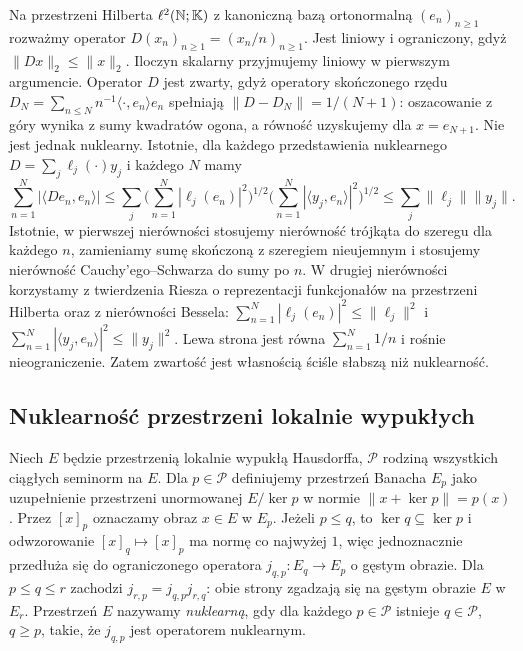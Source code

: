 \begin{przyklad}
\label{ex:compact-nonnuclear23}
Na przestrzeni Hilberta $\ell^2(\mathbb N;\mathbb K)$ z kanoniczną
bazą ortonormalną $(e_n)_{n\ge1}$ rozważmy operator
$D(x_n)_{n\ge1}=(x_n/n)_{n\ge1}$. Jest liniowy i
ograniczony, gdyż $\|Dx\|_2\le\|x\|_2$.
Iloczyn skalarny przyjmujemy liniowy w pierwszym argumencie.
Operator $D$ jest zwarty, gdyż operatory skończonego rzędu
$D_N=\sum_{n\le N}n^{-1}\langle\cdot,e_n\rangle e_n$
spełniają $\|D-D_N\|=1/(N+1)$:
oszacowanie z góry wynika z sumy kwadratów ogona,
a równość uzyskujemy dla $x=e_{N+1}$. Nie jest jednak
nuklearny. Istotnie, dla każdego przedstawienia nuklearnego
$D=\sum_j\ell_j(\cdot)y_j$ i każdego $N$ mamy
\[
\sum_{n=1}^N|\langle De_n,e_n\rangle|
\le\sum_j
\Big(\sum_{n=1}^N|\ell_j(e_n)|^2\Big)^{1/2}
\Big(\sum_{n=1}^N|\langle y_j,e_n\rangle|^2\Big)^{1/2}
\le\sum_j\|\ell_j\|\|y_j\|.
\]
Istotnie, w pierwszej nierówności stosujemy nierówność
trójkąta do szeregu dla każdego $n$, zamieniamy sumę
skończoną z szeregiem nieujemnym i stosujemy nierówność
Cauchy'ego--Schwarza do sumy po $n$. W drugiej nierówności
korzystamy z twierdzenia Riesza o reprezentacji funkcjonałów
na przestrzeni Hilberta oraz z nierówności Bessela:
$\sum_{n=1}^N|\ell_j(e_n)|^2\le\|\ell_j\|^2$ i
$\sum_{n=1}^N|\langle y_j,e_n\rangle|^2\le\|y_j\|^2$.
Lewa strona jest równa $\sum_{n=1}^N1/n$ i rośnie
nieograniczenie. Zatem zwartość jest własnością ściśle
słabszą niż nuklearność.
\end{przyklad}

\subsection{Nuklearność przestrzeni lokalnie wypukłych}

\begin{definicja}
\label{def:nuclear-lcs23}
Niech $E$ będzie przestrzenią lokalnie wypukłą Hausdorffa,
$\mathcal P$ rodziną wszystkich ciągłych seminorm na $E$.
Dla $p\in\mathcal P$ definiujemy przestrzeń Banacha $E_p$
jako uzupełnienie przestrzeni unormowanej $E/\ker p$
w normie $\|x+\ker p\|=p(x)$.
Przez $[x]_p$ oznaczamy obraz $x\in E$ w $E_p$.
Jeżeli $p\le q$, to $\ker q\subseteq\ker p$ i
odwzorowanie $[x]_q\mapsto[x]_p$ ma normę co najwyżej $1$,
więc jednoznacznie przedłuża się do ograniczonego operatora
$j_{q,p}:E_q\to E_p$ o gęstym obrazie.
Dla $p\le q\le r$ zachodzi $j_{r,p}=j_{q,p}j_{r,q}$:
obie strony zgadzają się na gęstym obrazie $E$ w $E_r$.
Przestrzeń $E$ nazywamy \emph{nuklearną}, gdy dla każdego
$p\in\mathcal P$ istnieje $q\in\mathcal P$, $q\ge p$,
takie, że $j_{q,p}$ jest operatorem nuklearnym.
\end{definicja}

